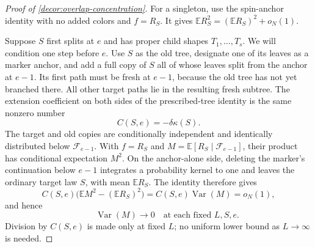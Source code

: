 \begin{proof}[Proof of \cref{decor:overlap-concentration}]
For a singleton, use the spin-anchor identity with no added colors
and $f=R_S$.  It gives
$\mathbb ER_S^2=(\mathbb ER_S)^2+o_N(1)$.

Suppose $S$ first splits at $e$ and has proper child shapes
$T_1,\ldots,T_s$. We will condition one step before $e$. Use $S$ as
the old tree, designate one of its
leaves as a marker anchor, and add a full copy of $S$ all of whose
leaves split from the anchor at $e-1$.  Its first path must be
fresh at $e-1$, because the old tree has not yet branched there.
All other target paths lie in the resulting fresh subtree.
The extension coefficient on both sides of the prescribed-tree
identity is the same nonzero number
\begin{equation}
 C(S,e)=-\delta \kappa(S).
 \label{decor:marker-coefficient}
\end{equation}
The target and old copies are conditionally independent and
identically distributed below $\mathscr F_{e-1}$. With
$f=R_S$ and $M=\mathbb E[R_S\mid\mathscr F_{e-1}]$, their product has
conditional expectation $M^2$. On the anchor-alone side, deleting the
marker's continuation below $e-1$ integrates a probability kernel to one
and leaves the ordinary target law $S$, with mean $\mathbb E R_S$.
The identity therefore gives
\begin{equation}
 C(S,e)\bigl(\mathbb EM^2-(\mathbb E R_S)^2\bigr)
 =C(S,e)\operatorname{Var}(M)=o_N(1),
 \label{decor:marker-variance-identity}
\end{equation}
and hence
\begin{equation}
 \qquad \operatorname{Var}(M)\longrightarrow0
 \quad\text{at each fixed }L,S,e.
 \label{decor:prefix-projection-concentration}
\end{equation}
Division by $C(S,e)$ is made only at fixed $L$; no uniform lower
bound as $L\to\infty$ is needed.


\end{proof}
